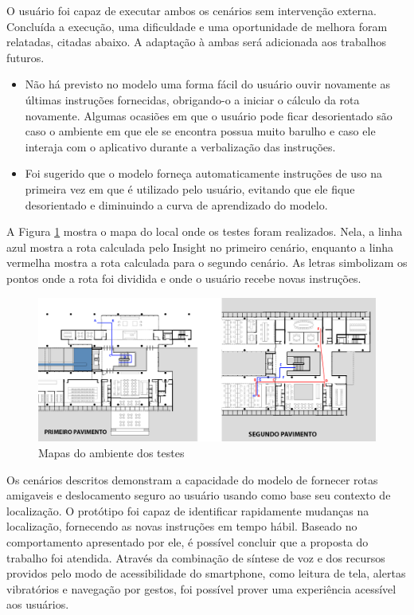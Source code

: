 \documentclass[twoside,english,brazilian]{UNISINOSartigo}
\begin{document}
O usuário foi capaz de executar ambos os cenários sem intervenção externa. Concluída a execução, uma dificuldade e uma oportunidade de melhora foram relatadas, citadas abaixo. A adaptação à ambas será adicionada aos trabalhos futuros.
\begin{itemize}
	\item Não há previsto no modelo uma forma fácil do usuário ouvir novamente as últimas instruções fornecidas, obrigando-o a iniciar o cálculo da rota novamente. Algumas ocasiões em que o usuário pode ficar desorientado são caso o ambiente em que ele se encontra possua muito barulho e caso ele interaja com o aplicativo durante a verbalização das instruções. 

	\item Foi sugerido que o modelo forneça automaticamente instruções de uso na primeira vez em que é utilizado pelo usuário, evitando que ele fique desorientado e diminuindo a curva de aprendizado do modelo.
\end{itemize}

A Figura \ref{apendice:planta1} mostra o mapa do local onde os testes foram realizados. Nela, a linha azul mostra a rota calculada pelo Insight no primeiro cenário, enquanto a linha vermelha mostra a rota calculada para o segundo cenário. As letras simbolizam os pontos onde a rota foi dividida e onde o usuário recebe novas instruções.

 	\begin{figure}[!ht]
 		\caption{Mapas do ambiente dos testes}
 		\label{apendice:planta1}
 		\centering%
 		\begin{minipage}{0.8\textwidth}
 			\includegraphics[width=\textwidth]{imgs/unicaImagem}
 		\end{minipage}
 	\end{figure}

Os cenários descritos demonstram a capacidade do modelo de fornecer rotas amigaveis e deslocamento seguro ao usuário usando como base seu contexto de localização. O protótipo foi capaz de identificar rapidamente mudanças na localização, fornecendo as novas instruções em tempo hábil. Baseado no comportamento apresentado por ele, é possível concluir que a proposta do trabalho foi atendida. Através da combinação de síntese de voz e dos recursos providos pelo modo de acessibilidade do smartphone, como leitura de tela, alertas vibratórios e navegação por gestos, foi possível prover uma experiência acessível aos usuários.
\end{document}

